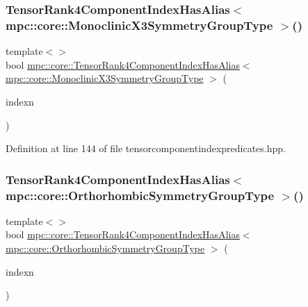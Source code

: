 \subsubsection{\texorpdfstring{Tensor\+Rank4\+Component\+Index\+Has\+Alias$<$ mpc\+::core\+::\+Monoclinic\+X3\+Symmetry\+Group\+Type $>$()}{TensorRank4ComponentIndexHasAlias< mpc::core::MonoclinicX3SymmetryGroupType >()}}
{\footnotesize\ttfamily template$<$$>$ \\
bool \mbox{\hyperlink{namespacempc_1_1core_a7242817d0014fa66d25e5cf10a2c4ddf}{mpc\+::core\+::\+Tensor\+Rank4\+Component\+Index\+Has\+Alias}}$<$ \mbox{\hyperlink{structmpc_1_1core_1_1_monoclinic_x3_symmetry_group_type}{mpc\+::core\+::\+Monoclinic\+X3\+Symmetry\+Group\+Type}} $>$ (\begin{DoxyParamCaption}\item[{const \mbox{\hyperlink{namespacempc_1_1core_a54c081f41b2475abd10182bf023805d2}{mpc\+::core\+::\+Tensor\+Rank4\+Component\+Index}} \&}]{indexn }\end{DoxyParamCaption})\hspace{0.3cm}{\ttfamily [inline]}}



Definition at line 144 of file tensorcomponentindexpredicates.\+hpp.

\mbox{\label{namespacempc_1_1core_aed5c66342dec29f784602d5b3637fc6c}} 
\subsubsection{\texorpdfstring{Tensor\+Rank4\+Component\+Index\+Has\+Alias$<$ mpc\+::core\+::\+Orthorhombic\+Symmetry\+Group\+Type $>$()}{TensorRank4ComponentIndexHasAlias< mpc::core::OrthorhombicSymmetryGroupType >()}}
{\footnotesize\ttfamily template$<$$>$ \\
bool \mbox{\hyperlink{namespacempc_1_1core_a7242817d0014fa66d25e5cf10a2c4ddf}{mpc\+::core\+::\+Tensor\+Rank4\+Component\+Index\+Has\+Alias}}$<$ \mbox{\hyperlink{structmpc_1_1core_1_1_orthorhombic_symmetry_group_type}{mpc\+::core\+::\+Orthorhombic\+Symmetry\+Group\+Type}} $>$ (\begin{DoxyParamCaption}\item[{const \mbox{\hyperlink{namespacempc_1_1core_a54c081f41b2475abd10182bf023805d2}{mpc\+::core\+::\+Tensor\+Rank4\+Component\+Index}} \&}]{indexn }\end{DoxyParamCaption})\hspace{0.3cm}{\ttfamily [inline]}}



